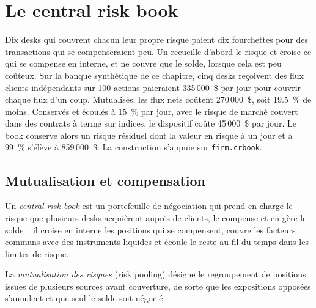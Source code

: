 \chapter{Le central risk book}\label{ch:s2:the-central-risk-book}

Dix desks qui couvrent chacun leur propre risque paient dix fourchettes pour des transactions qui se compenseraient peu. Un  recueille d'abord le risque et croise ce qui
se compense en interne, et ne couvre que le solde, lorsque cela est peu coûteux. Sur la banque synthétique de ce chapitre, cinq desks reçoivent des flux clients indépendants sur
100 actions paieraient 335\,000~\$ par jour pour couvrir chaque flux d'un coup. Mutualisés, les flux nets coûtent 270\,000~\$, soit 19.5~\% de moins. Conservés et écoulés à 15~\% par jour, avec
le risque de marché couvert dans des contrats à terme sur indices, le dispositif coûte 45\,000~\$ par jour. Le book conserve alors un risque résiduel dont la valeur en risque à un jour et à 99~\% s'élève à 859\,000~\$.
La construction s'appuie sur \texttt{firm.crbook}.

\section{Mutualisation et compensation}

\begin{definition}\label{def:s2:the-central-risk-book:crb}
Un \emph{central risk book} est un portefeuille de négociation qui prend en charge le risque que plusieurs desks acquièrent auprès de clients, le compense et
en gère le solde~: il croise en interne les positions qui se compensent, couvre les facteurs communs avec des instruments liquides et écoule le reste au fil du temps dans les
limites de risque.
\end{definition}

\begin{definition}\label{def:s2:the-central-risk-book:pooling}
La \emph{mutualisation des risques} (risk pooling) désigne le regroupement de positions issues de plusieurs sources avant couverture, de sorte que les expositions opposées s'annulent et que seul le
solde soit négocié.
\end{definition}

